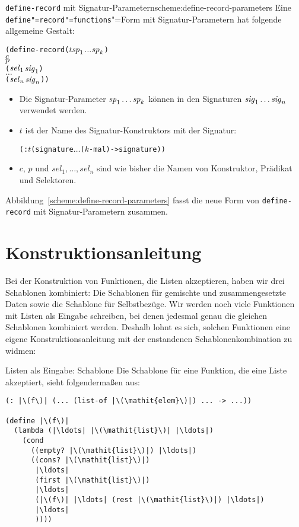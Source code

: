 \begin{feature}{\texttt{define-record} mit Signatur-Parametern}{scheme:define-record-parameters}
Eine \texttt{define"=record"=functions}"=Form
mit Signatur-Parametern hat folgende allgemeine Gestalt:\label{def:define-record-parameters}
%
\begin{alltt}
(define-record (\(t\) \(\mathit{sp}\sb{1}\) \(\ldots\) \(\mathit{sp}\sb{k}\))
  \(c\)
  \(p\)
  (\(\mathit{sel}\sb{1}\) \(\mathit{sig}\sb{1}\))
  \(\ldots\)
  (\(\mathit{sel}\sb{n}\) \(\mathit{sig}\sb{n}\)))
\end{alltt}
%
%
\begin{itemize}
\item Die Signatur-Parameter $\mathit{sp}\sb{1} \ldots \mathit{sp}\sb{k}$
können in den Signaturen
\(\mathit{sig}\sb{1}\ldots\mathit{sig}\sb{n}\) verwendet werden.
\item $t$ ist der Name des Signatur-Konstruktors mit der Signatur:
\begin{alltt}
(: \(t\) (signature \(\ldots\) \textrm{(\(k\)-mal)} -> signature))
\end{alltt}
  \item $c$, $p$ und $\mathit{sel}_1, \ldots, \mathit{sel}_n$ sind wie
    bisher die Namen von Konstruktor, Prädikat und Selektoren.
\end{itemize}
%
\end{feature}

Abbildung~\ref{scheme:define-record-parameters} fasst die
neue Form von \lstinline{define-record} mit
Signatur-Parametern zusammen.

\section{Konstruktionsanleitung}

Bei der Konstruktion von Funktionen, die Listen akzeptieren, haben wir
drei Schablonen kombiniert: Die Schablonen für gemischte und
zusammengesetzte Daten sowie die Schablone für Selbstbezüge.  Wir
werden noch viele Funktionen mit Listen als Eingabe schreiben, bei
denen jedesmal genau die gleichen Schablonen kombiniert werden.
Deshalb lohnt es sich, solchen Funktionen eine eigene
Konstruktionsanleitung mit der enstandenen Schablonenkombination zu widmen:

\begin{konstruktionsanleitung}{Listen als Eingabe: Schablone}
  \label{ka:listen-eingabe-schablone}
Die Schablone für eine Funktion, die eine Liste akzeptiert, sieht
folgendermaßen aus:
%
\begin{lstlisting}
(: |\(f\)| (... (list-of |\(\mathit{elem}\)|) ... -> ...))

(define |\(f\)|
  (lambda (|\ldots| |\(\mathit{list}\)| |\ldots|)
    (cond
      ((empty? |\(\mathit{list}\)|) |\ldots|)
      ((cons? |\(\mathit{list}\)|)
       |\ldots|
       (first |\(\mathit{list}\)|)
       |\ldots|
       (|\(f\)| |\ldots| (rest |\(\mathit{list}\)|) |\ldots|)
       |\ldots|
       ))))
\end{lstlisting}
  
  
\end{konstruktionsanleitung}

